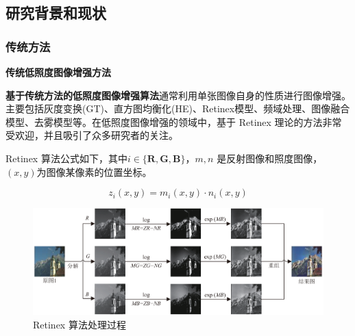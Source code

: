 \documentclass[CJK,aspectratio=169]{beamer}  %
\begin{document}
	\subsection{研究背景和现状}
	
	\subsubsection{传统方法}
	
	\begin{frame}
		{ \yahei \textbf{传统低照度图像增强方法}}
		
		{ \yahei \textbf{基于传统方法的低照度图像增强算法}通常利用单张图像自身的性质进行图像增强。主要包括灰度变换(GT)\textcolor{blue}{\citep{ueng1995gamma}}、直方图均衡化(HE)\textcolor{blue}{\citep{stark2000adaptive}}、Retinex模型\textcolor{blue}{\citep{land1971lightness}}、频域处理\textcolor{blue}{\citep{liu2021benchmarking}}、图像融合模型\textcolor{blue}{\citep{dai2019fractional}}、去雾模型\textcolor{blue}{\citep{ma2019improved}}等。在低照度图像增强的领域中，基于 Retinex 理论的方法非常受欢迎，并且吸引了众多研究者的关注。}
		
		\vspace{0.2cm}
		
		{ \yahei  Retinex 算法公式如下，其中$i \in \{\mathbf{R, G, B}\}$，$m,n$ 是反射图像和照度图像，$(x,y)$为图像某像素的位置坐标。}
		
		{ \yahei $$z_i\left(x,y\right) = m_i\left(x,y\right) \cdot n_i\left(x,y\right)$$}
				
		\vspace{0.1cm}
		
		\begin{figure}
			\centering 
			\includegraphics[width=0.5\columnwidth]{picture/LLIE/Retinex Model/Retinex Model}
			\caption{
				\label{fig: Retinex model} 
				\tiny Retinex 算法处理过程
			}
		\end{figure}
	\end{frame}
	
\end{document}
